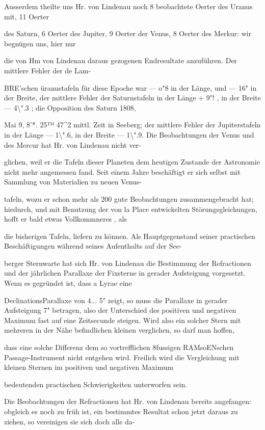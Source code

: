 \documentclass[10pt,a4paper]{article}
\begin{document}
Ausserdem theilte uns Hr. von Lindenau noch 8 beobachtete Oerter des Uranus mit, 11 Oerter

des Saturn, 6 Oerter des Jupiter, 9 Oerter der Venus, 8 Oerter des Merkur: wir begnügen uns, hier nur

die von Hm von Lindenau daraus gezogenen Endresultate anzuführen. Der mittlere Fehler der de Lam-

BRE'schen üranustafeln für diese Epoche war — o"8 in der Länge, und — 16" in der Breite, der mittlere Fehler der Saturnstafeln in der Länge + 9"! , in der Breite — 4\textbackslash{}".3 ; die Opposition des Saturn 1808,

Mai 9, 8'*. 25™ 47\textasciicircum{}2 mittl. Zeit in Seeberg; der mittlere Fehler der Jupiterstafeln in der Länge — 1\textbackslash{}".6, in der Breite — 1\textbackslash{}".9. Die Beobachtungen der Venus und des Mercur hat Hr. von Lindenau nicht ver-

glichen, weil er die Tafeln dieser Planeten dem heutigen Zustande der Astronomie nicht mehr angemessen fand. Seit einem Jahre beschäftigt er sich selbst mit Sammlung von Materialien zu neuen Venus-

tafeln, wozu er schon mehr als 200 gute Beobachtungen zusammengebracht hat; hiedurch, und mit Benutzung der von la Place entwickelten Störungsgleichungen, hofft er bald etwas Vollkommneres , als

die bisherigen Tafeln, liefern zu können. Als Hauptgegenstand seiner practischen Beschäftigungen während seines Aufenthalts auf der See-

berger Sternwarte hat sich Hr. von Lindenau die Bestimmung der Refractionen und der jährlichen Parallaxe der Fixsterne in gerader Aufsteigung vorgesetzt. Wenn es gegründet ist, dass a Lyrae eine

DeclinationsParallaxe von 4... 5" zeigt, so muss die Parallaxe in gerader Aufsteigung 7" betragen, also der Unterschied des positiven und negativen Maximum fast auf eine Zeitsecunde steigen. Wird also ein solcher Stern mit mehreren in der Nähe befindlichen kleinen verglichen, so darf man hoffen,

dass eine solche Differenz dem so vortrefflichen 8fussigen RAMsoENschen Passage-Instrument nicht entgehen wird. Freilich wird die Vergleichung mit kleinen Sternen im positiven und negativen Maximum

bedeutenden practischen Schwierigkeiten unterworfen sein.

Die Beobachtungen der Refractionen hat Hr. von Lindenau bereits angefangen: obgleich es noch zu früh ist, ein bestimmtes Resultat schon jetzt daraus zu ziehen, so vereinigen sie sich doch alle da-
\end{document}
